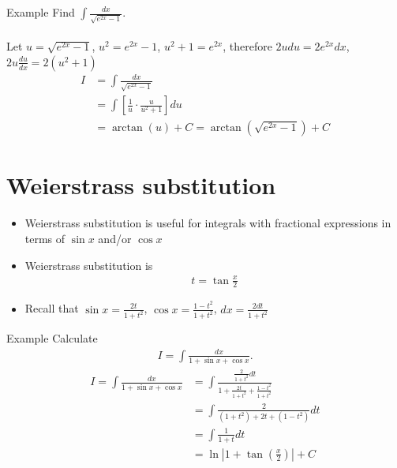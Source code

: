 \documentclass{report}
\begin{document}
		\begin{question}{Example}
			Find $\int \frac{dx}{\sqrt{e^{2x} - 1}}$.
			\\ \\
			Let $u = \sqrt{e^{2x} - 1}$, $u^2 = e^{2x} - 1$, $u^2 + 1 = e^{2x}$, therefore $2u du = 2 e^{2x} dx$, $2u \frac{du}{dx} = 2 (u^2 + 1)$
			\begin{align*}
				I &= \int \frac{dx}{\sqrt{e^{2x}- 1}}	\\
				  &= \int \left[\frac{1}{u} \cdot \frac{u}{u^2 + 1}\right] du	\\
				  &= \arctan(u) + C = \arctan(\sqrt{e^{2x} - 1}) + C
			\end{align*}
		\end{question}

	\section{Weierstrass substitution}

		\begin{itemize}
			\item Weierstrass substitution is useful for integrals with fractional expressions in terms of $\sin x$ and/or $\cos x$
			\item Weierstrass substitution is
				\begin{align*}
					t = \tan \frac{x}{2}
				\end{align*}
			\item Recall that $\sin x = \frac{2t}{1 + t^2}$, $\cos x = \frac{1 - t^2}{1 + t^2}$, $dx = \frac{2dt}{1 + t^2}$
		\end{itemize}

		\begin{question}{Example}
			Calculate
			\begin{align*}
				I = \int \frac{dx}{1 + \sin x + \cos x}.
			\end{align*}
			\begin{align*}
				I = \int \frac{dx}{1 + \sin x + \cos x} &= \int \frac{\frac{2}{1 + t^2} dt}{1 + \frac{2t}{1 + t^2} + \frac{1 - t^2}{1 + t^2}}	\\
														&= \int \frac{2}{(1 + t^2) + 2t + (1 - t^2)} dt	\\
														&= \int \frac{1}{1 + t} dt	\\
														&= \ln|1 + \tan(\frac{x}{2})| + C
			\end{align*}
		\end{question}
\end{document}
